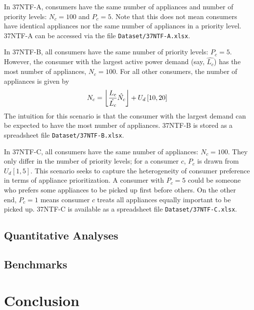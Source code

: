 \documentclass[journal, a4paper]{IEEEtran}
\DeclarePairedDelimiter\floor{\lfloor}{\rfloor}
\begin{document}
In 37NTF-A, consumers have the same number of appliances and number of priority levels:
$N_{c} = 100$ and $P_{c} = 5$.
Note that this does not mean consumers have identical appliances nor the same number of appliances in a priority level.
37NTF-A can be accessed via the file \texttt{Dataset/37NTF-A.xlsx}.

In 37NTF-B, all consumers have the same number of priority levels: $P_{c} = 5$.
However, the consumer with the largest active power demand (say, $\hat{L_{c}}$)
has the most number of appliances, $\hat{N_{c}} = 100$.
For all other consumers, the number of appliances is given by
\begin{equation*}
	N_{c} = \floor*{\frac{L_{c}}{\hat{L_{c}}} \hat{N_{c}}} + U_{d} \left[10,20\right]
\end{equation*}
The intuition for this scenario is that the consumer with the largest demand can be expected to have the most number of appliances.
37NTF-B is stored as a spreadsheet file \texttt{Dataset/37NTF-B.xlsx}.

In 37NTF-C, all consumers have the same number of appliances: $N_{c} = 100$.
They only differ in the number of priority levels;
for a consumer $c$, $P_{c}$ is drawn from $U_{d} \left[1,5\right]$.
This scenario seeks to capture the heterogeneity of consumer preference in terms of appliance prioritization.
A consumer with $P_{c} = 5$ could be someone who prefers some appliances to be picked up first before others.
On the other end, $P_{c} = 1$ means consumer $c$ treats all appliances equally important to be picked up.
37NTF-C is available as a spreadsheet file \texttt{Dataset/37NTF-C.xlsx}.


\subsection{Quantitative Analyses}
\label{subsec: III. Quantitative Analyses}

\subsection{Benchmarks}
\label{subsec: III. Benchmarks}

\section{Conclusion}
\label{sec: Conclusion}

\lipsum[28]





\end{document}
